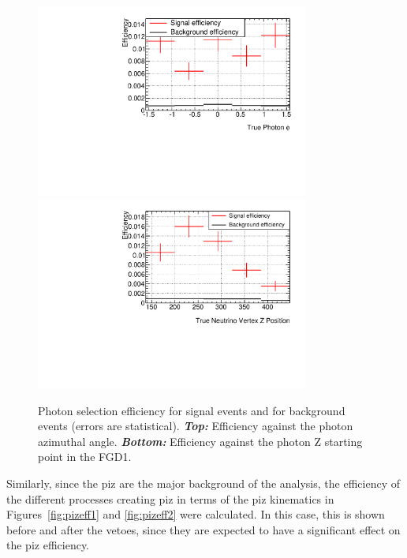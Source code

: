 \begin{figure}[ht]
  \center
  \includegraphics[width=0.8\textwidth]{images/NCg/Eff_gamma_phi.pdf}\\
  \includegraphics[width=0.8\textwidth]{images/NCg/Eff_gamma_pos.pdf}
  \caption[Photon selection efficiency for signal events and for
  background events against photon azimuthal angle and photon creation
  point.]{Photon selection efficiency for signal events and for
    background events (errors are statistical). \textbf{\textit{Top:}}
    Efficiency against the photon azimuthal
    angle. \textbf{\textit{Bottom:}} Efficiency against the photon Z
    starting point in the \Gls{FGD}1.}
  \label{fig:photoneff2}
\end{figure}

Similarly, since the \Gls{piz} are the major background of the
analysis, the efficiency of the different processes creating \Gls{piz}
in terms of the \Gls{piz} kinematics in Figures~\ref{fig:pizeff1} and
\ref{fig:pizeff2} were calculated. In this case, this is shown before
and after the vetoes, since they are expected to have a significant
effect on the \Gls{piz} efficiency.

